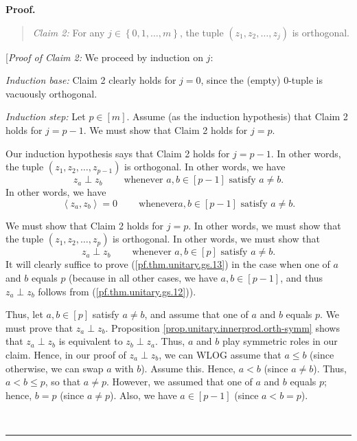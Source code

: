 \documentclass[numbers=enddot,12pt,final,onecolumn,notitlepage]{scrartcl}%
\numberwithin{exer}{subsection}
\theoremstyle{definition}
\newenvironment{statement}{\begin{quote}}{\end{quote}}
\newenvironment{proof}[1][Proof]{\noindent\textbf{#1.} }{\ \rule{0.5em}{0.5em}}
\begin{document}
\begin{proof}
\begin{statement}
\textit{Claim 2:} For any $j\in\left\{  0,1,\ldots,m\right\}  $, the tuple
$\left(  z_{1},z_{2},\ldots,z_{j}\right)  $ is orthogonal.
\end{statement}

[\textit{Proof of Claim 2:} We proceed by induction on $j$:

\textit{Induction base:} Claim 2 clearly holds for $j=0$, since the (empty)
$0$-tuple is vacuously orthogonal.

\textit{Induction step:} Let $p\in\left[  m\right]  $. Assume (as the
induction hypothesis) that Claim 2 holds for $j=p-1$. We must show that Claim
2 holds for $j=p$.

Our induction hypothesis says that Claim 2 holds for $j=p-1$. In other words,
the tuple $\left(  z_{1},z_{2},\ldots,z_{p-1}\right)  $ is orthogonal. In
other words, we have%
\begin{equation}
z_{a}\perp z_{b}\ \ \ \ \ \ \ \ \ \ \text{whenever }a,b\in\left[  p-1\right]
\text{ satisfy }a\neq b. \label{pf.thm.unitary.gs.12}%
\end{equation}
In other words, we have%
\begin{equation}
\left\langle z_{a},z_{b}\right\rangle =0\ \ \ \ \ \ \ \ \ \ \text{whenever
}a,b\in\left[  p-1\right]  \text{ satisfy }a\neq b.
\label{pf.thm.unitary.gs.12b}%
\end{equation}


We must show that Claim 2 holds for $j=p$. In other words, we must show that
the tuple $\left(  z_{1},z_{2},\ldots,z_{p}\right)  $ is orthogonal. In other
words, we must show that%
\begin{equation}
z_{a}\perp z_{b}\ \ \ \ \ \ \ \ \ \ \text{whenever }a,b\in\left[  p\right]
\text{ satisfy }a\neq b. \label{pf.thm.unitary.gs.13}%
\end{equation}
It will clearly suffice to prove (\ref{pf.thm.unitary.gs.13}) in the case when
one of $a$ and $b$ equals $p$ (because in all other cases, we have
$a,b\in\left[  p-1\right]  $, and thus $z_{a}\perp z_{b}$ follows from
(\ref{pf.thm.unitary.gs.12})).

Thus, let $a,b\in\left[  p\right]  $ satisfy $a\neq b$, and assume that one of
$a$ and $b$ equals $p$. We must prove that $z_{a}\perp z_{b}$. Proposition
\ref{prop.unitary.innerprod.orth-symm} shows that $z_{a}\perp z_{b}$ is
equivalent to $z_{b}\perp z_{a}$. Thus, $a$ and $b$ play symmetric roles in
our claim. Hence, in our proof of $z_{a}\perp z_{b}$, we can WLOG assume that
$a\leq b$ (since otherwise, we can swap $a$ with $b$). Assume this. Hence,
$a<b$ (since $a\neq b$). Thus, $a<b\leq p$, so that $a\neq p$. However, we
assumed that one of $a$ and $b$ equals $p$; hence, $b=p$ (since $a\neq p$).
Also, we have $a\in\left[  p-1\right]  $ (since $a<b=p$).


\end{proof}
\end{document}
